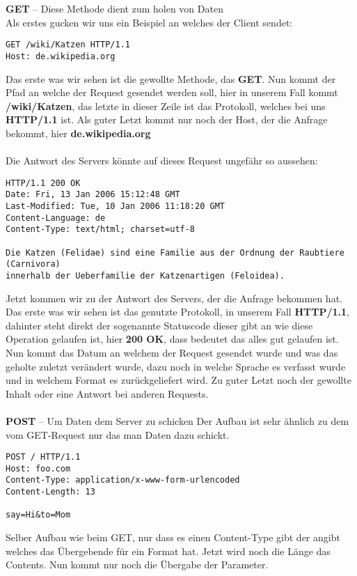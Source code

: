 \textbf{GET} -- Diese Methode dient zum holen von Daten\\Als erstes gucken wir uns ein Beispiel an welches der Client sendet:
\begin{lstlisting}
GET /wiki/Katzen HTTP/1.1
Host: de.wikipedia.org
\end{lstlisting}
Das erste was wir sehen ist die gewollte Methode, das \textbf{GET}. Nun kommt der Pfad an welche der Request gesendet werden soll, hier in unserem Fall kommt \textbf{/wiki/Katzen}, das letzte in dieser Zeile ist das Protokoll, welches bei uns \textbf{HTTP/1.1} ist. Als guter Letzt kommt nur noch der Host, der die Anfrage bekommt, hier \textbf{de.wikipedia.org}\\\\
Die Antwort des Servers könnte auf dieses Request ungefähr so aussehen:
\begin{lstlisting}
HTTP/1.1 200 OK
Date: Fri, 13 Jan 2006 15:12:48 GMT
Last-Modified: Tue, 10 Jan 2006 11:18:20 GMT
Content-Language: de
Content-Type: text/html; charset=utf-8

Die Katzen (Felidae) sind eine Familie aus der Ordnung der Raubtiere (Carnivora)
innerhalb der Ueberfamilie der Katzenartigen (Feloidea).
\end{lstlisting}
Jetzt kommen wir zu der Antwort des Servers, der die Anfrage bekommen hat. Das erste was wir sehen ist das genutzte Protokoll, in unserem Fall \textbf{HTTP/1.1}, dahinter steht direkt der sogenannte Statuscode dieser gibt an wie diese Operation gelaufen ist, hier \textbf{200 OK}, dass bedeutet das alles gut gelaufen ist. Nun kommt das Datum an welchem der Request gesendet wurde und was das geholte zuletzt verändert wurde, dazu noch in welche Sprache es verfasst wurde und in welchem Format es zurückgeliefert wird. Zu guter Letzt noch der gewollte Inhalt oder eine Antwort bei anderen Requests.\\\\

\textbf{POST} -- Um Daten dem Server zu schicken
Der Aufbau ist sehr ähnlich zu dem vom GET-Request nur das man Daten dazu schickt.
\begin{lstlisting}
POST / HTTP/1.1
Host: foo.com
Content-Type: application/x-www-form-urlencoded
Content-Length: 13

say=Hi&to=Mom
\end{lstlisting}
Selber Aufbau wie beim GET, nur dass es einen Content-Type gibt der angibt welches das Übergebende für ein Format hat. Jetzt wird noch die Länge das Contents. Nun kommt nur noch die Übergabe der Parameter. \\\\

